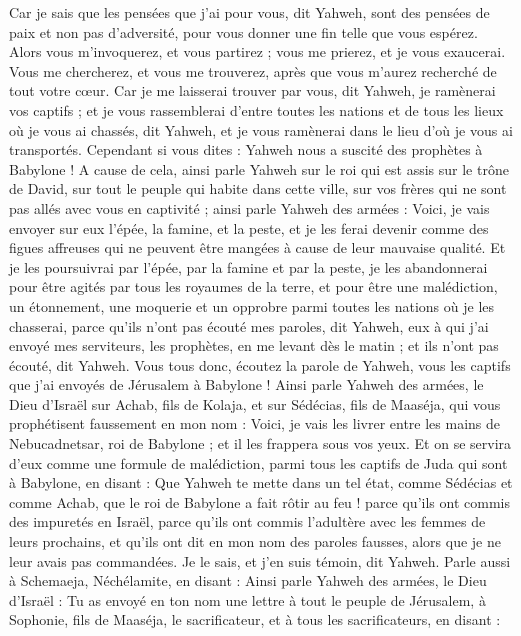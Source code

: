 \begin{multicols}{2}
Car je sais que les pensées que j'ai pour vous, dit Yahweh, sont des pensées de paix et non pas d'adversité, pour vous donner une fin telle que vous espérez.
Alors vous m'invoquerez, et vous partirez ; vous me prierez, et je vous exaucerai.
Vous me chercherez, et vous me trouverez, après que vous m'aurez recherché de tout votre cœur.
Car je me laisserai trouver par vous, dit Yahweh, je ramènerai vos captifs ; et je vous rassemblerai d'entre toutes les nations et de tous les lieux où je vous ai chassés, dit Yahweh, et je vous ramènerai dans le lieu d'où je vous ai transportés.
Cependant si vous dites : Yahweh nous a suscité des prophètes à Babylone !
 A cause de cela, ainsi parle Yahweh sur le roi qui est assis sur le trône de David, sur tout le peuple qui habite dans cette ville, sur vos frères qui ne sont pas allés avec vous en captivité ;
ainsi parle Yahweh des armées : Voici, je vais envoyer sur eux l'épée, la famine, et la peste, et je les ferai devenir comme des figues affreuses qui ne peuvent être mangées à cause de leur mauvaise qualité.
Et je les poursuivrai par l'épée, par la famine et par la peste, je les abandonnerai pour être agités par tous les royaumes de la terre, et pour être une malédiction, un étonnement, une moquerie et un opprobre parmi toutes les nations où je les chasserai,
parce qu'ils n'ont pas écouté mes paroles, dit Yahweh, eux à qui j'ai envoyé mes serviteurs, les prophètes, en me levant dès le matin ; et ils n'ont pas écouté, dit Yahweh.
Vous tous donc, écoutez la parole de Yahweh, vous les captifs que j'ai envoyés de Jérusalem à Babylone !
Ainsi parle Yahweh des armées, le Dieu d'Israël sur Achab, fils de Kolaja, et sur Sédécias, fils de Maaséja, qui vous prophétisent faussement en mon nom : Voici, je vais les livrer entre les mains de Nebucadnetsar, roi de Babylone ; et il les frappera sous vos yeux.
Et on se servira d'eux comme une formule de malédiction, parmi tous les captifs de Juda qui sont à Babylone, en disant : Que Yahweh te mette dans un tel état, comme Sédécias et comme Achab, que le roi de Babylone a fait rôtir au feu !
parce qu'ils ont commis des impuretés en Israël, parce qu'ils ont commis l'adultère avec les femmes de leurs prochains, et qu'ils ont dit en mon nom des paroles fausses, alors que je ne leur avais pas commandées. Je le sais, et j'en suis témoin, dit Yahweh.
Parle aussi à Schemaeja, Néchélamite, en disant :
Ainsi parle Yahweh des armées, le Dieu d'Israël : Tu as envoyé en ton nom une lettre à tout le peuple de Jérusalem, à Sophonie, fils de Maaséja, le sacrificateur, et à tous les sacrificateurs, en disant :

\end{multicols}
